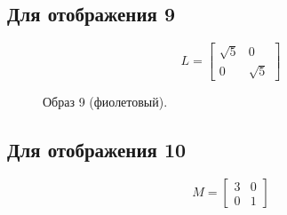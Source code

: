 \documentclass[a5paper, 10pt]{article}
\theoremstyle{definition}
\theoremstyle{plain}
\theoremstyle{remark}
\begin{document}
\newpage
\subsection{Для отображения 9}
\begin{equation}
L =
\begin{bmatrix}
\sqrt{5} & 0\\
0 & \sqrt{5}
\end{bmatrix}
\end{equation}

\begin{figure}[h]
\caption{Образ 9 (фиолетовый).}
\end{figure}

\newpage
\subsection{Для отображения 10}
\begin{equation}
M =
\begin{bmatrix}
3 & 0\\
0 & 1
\end{bmatrix}
\end{equation}
\end{document}
